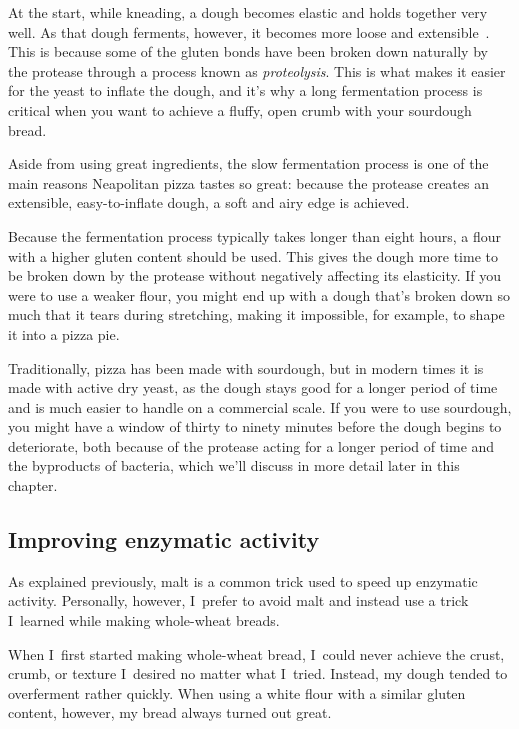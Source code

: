 At the start, while kneading, a dough becomes elastic and holds together very
well. As that dough ferments, however, it becomes more loose and
extensible~\cite{protease+enzyme+bread}. This is because some of the gluten
bonds have
been broken down naturally by the protease through a process known as
\emph{proteolysis}. This is what makes it easier for the yeast to inflate the
dough, and it's why a long fermentation process is critical when you want to
achieve a fluffy, open crumb with your sourdough bread.

Aside from using great ingredients, the slow fermentation process is one of the
main reasons Neapolitan pizza tastes so great: because the protease creates an
extensible, easy-to-inflate dough, a soft and airy edge is achieved.

Because the fermentation process typically takes longer than eight hours, a
flour with a higher gluten content should be used. This gives the dough more
time to be broken down by the protease without negatively affecting its
elasticity. If you were to use a weaker flour, you might end up with a dough
that's broken down so much that it tears during stretching, making it
impossible, for example, to shape it into a pizza pie.

Traditionally, pizza has been made with sourdough, but in modern times it is
made with active dry yeast, as the dough stays good for a longer period of time
and is much easier to handle on a commercial scale. If you were to use
sourdough, you might have a window of thirty to ninety minutes before the dough
begins to deteriorate, both because of the protease acting for a longer period
of time and the byproducts of bacteria, which we'll discuss in more detail later
in this chapter.

\subsection{Improving enzymatic activity}

As explained previously, malt is a common trick used to speed up enzymatic
activity. Personally, however, I~prefer to avoid malt and instead use a
trick I~learned while making whole-wheat breads.

When I~first started making whole-wheat bread, I~could never achieve the
crust, crumb, or texture I~desired no matter what I~tried. Instead, my dough
tended to overferment rather quickly. When using a white flour with a similar
gluten content, however, my bread always turned out great.

